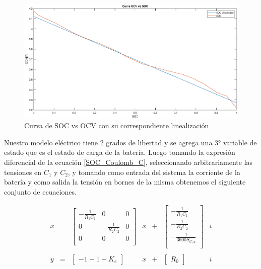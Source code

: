 \documentclass[10pt,a4paper]{article}
\begin{document}
\begin{figure}[h!]
    \begin{center}
	\includegraphics[width=1\textwidth]{SOC_vs_OCV.eps}
	\caption{Curva de SOC vs OCV con su correspondiente linealización }
	\label{SOC_vs_OCV}
    \end{center}
\end{figure}
\FloatBarrier

Nuestro modelo eléctrico tiene 2 grados de libertad y se agrega una 3° variable
de estado que es el estado de carga de la batería. Luego tomando la expresión
diferencial de la ecuación \ref{SOC_Coulomb_C}, seleccionando arbitrariamente
las tensiones en $C_1$ y $C_2$, y tomando como entrada del sistema la corriente
de la batería y como salida la tensión en bornes de la misma obtenemos el
siguiente conjunto de ecuaciones.

\begin{equation}
    \begin{array}{llcllcl}
	\dot{x} & = & \begin{bmatrix}
	    -\frac{1}{R_1 C_1} &            0       & 0 \\
	    0                  & -\frac{1}{R_2 C_2} & 0 \\
	    0                  &            0       & 0 \\
	\end{bmatrix} & x & + &     \begin{bmatrix}
	    -\frac{1}{R_1 C_1} \\
	    -\frac{1}{R_2 C_2}  \\
	    -\frac{1}{3600 S_{C,a}}\\
	\end{bmatrix} & i \\
	\\
	y & = & \begin{bmatrix}
	    -1-1-K_e 
	\end{bmatrix} & x & + & \begin{bmatrix}
	    R_0
	\end{bmatrix} & i \\
    \end{array}
\end{equation}
\end{document}
